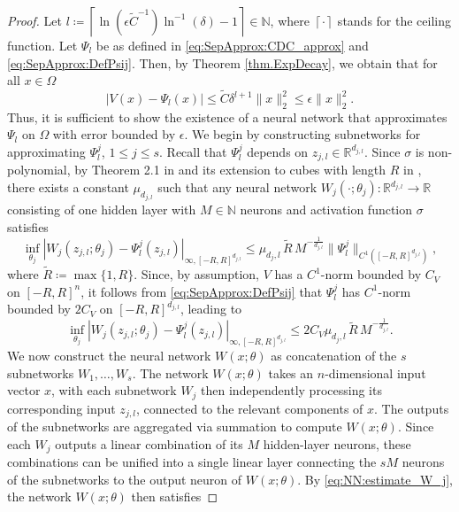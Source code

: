\documentclass{article}
\def\N{\mathbb{N}}
\newcommand{\R}{\mathbb{R}}
\begin{document}
\begin{proof} 
    Let $l \coloneqq \left\lceil{\ln\left(\epsilon {\widetilde{C}}^{-1} \right) \ln^{-1}(\delta) - 1} \right\rceil \in \N$, where $\left\lceil{\cdot }\right\rceil$ stands for the ceiling function. Let $\Psi_l$ be as defined in \eqref{eq:SepApprox:CDC_approx} and \eqref{eq:SepApprox:DefPsij}. Then, by Theorem \ref{thm.ExpDecay}, we obtain that for all $x \in \Omega$
    \[
    |V(x) - \Psi_l(x)| \leq \widetilde{C} \delta^{l+1} \|x\|^2_2 \leq \epsilon \|x\|^2_2.
    \]
    Thus, it is sufficient to show the existence of a neural network that approximates $\Psi_l$ on $\Omega$ with error bounded by $\epsilon$. We begin by constructing subnetworks for approximating $\Psi_l^j$, $1 \leq j \leq s$. Recall that $\Psi_l^j$ depends on $z_{j, l} \in \R^{d_{j, l}}$. Since $\sigma$ is non-polynomial, by Theorem 2.1 in \cite{mhaskar1996_NNApproxSmoothFunctions} and its extension to cubes with length $R$ in \cite{kang2022}, there exists a constant $\mu_{d_{j, l}}$ such that any neural network $W_j(\cdot; \theta_j) \colon \R^{d_{j, l}} \to \R$ consisting of one hidden layer with $M \in \mathbb{N}$ neurons and activation function $\sigma$ satisfies
    \[
    \inf_{\theta_j} |W_j(z_{j, l}; \theta_j) - \Psi_l^j(z_{j, l})|_{\infty, [-R,R]^{d_{j,l}}} \leq \mu_{d_j,l} \, \widetilde{R} \, {M}^{- \frac{1}{d_{j, l}}} \|\Psi_l^j\|_{C^1([-R,R]^{d_{j,l}})},  
    \] 
    where $\widetilde{R} \coloneqq \max\{1, R \}$. Since, by assumption, $V$ has a $C^1$-norm bounded by $C_V$ on $[-R,R]^n$, it follows from \eqref{eq:SepApprox:DefPsij} that $\Psi_l^j$ has $C^1$-norm bounded by $2 C_V$ on $[-R,R]^{d_{j,l}}$, leading to
    \begin{equation} \label{eq:NN:estimate_W_j}
        \inf_{\theta_j} |W_j(z_{j, l}; \theta_j) - \Psi_l^j(z_{j, l})|_{\infty, [-R,R]^{d_{j,l}}} \leq 2  C_V \mu_{d_j,l} \, \widetilde{R} \, {M}^{- \frac{1}{d_{j, l}}}. 
    \end{equation}
 We now construct the neural network \( W(x; \theta) \) as concatenation of the \( s \) subnetworks \( W_1, \dots, W_s \). The network \( W(x; \theta) \) takes an \( n \)-dimensional input vector \( x \), with each subnetwork \( W_j \) then independently processing its corresponding input \( z_{j,l} \), connected to the relevant components of \( x \). The outputs of the subnetworks are aggregated via summation to compute \( W(x; \theta) \). Since each \( W_j \) outputs a linear combination of its \( M \) hidden-layer neurons, these combinations can be unified into a single linear layer connecting the \( sM \) neurons of the subnetworks to the output neuron of \( W(x; \theta) \). By \eqref{eq:NN:estimate_W_j}, the network \( W(x; \theta) \) then satisfies 

\end{proof}
\end{document}
